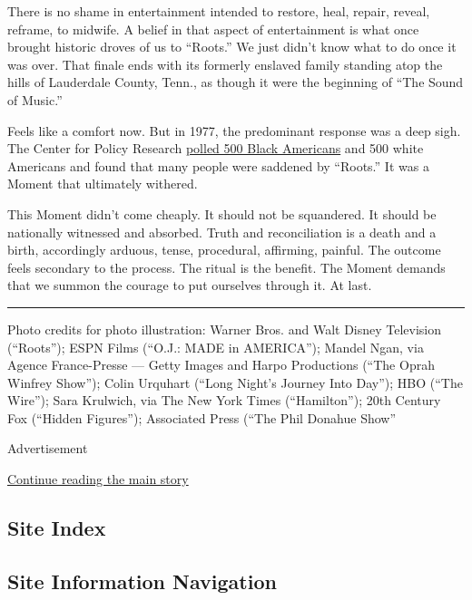 There is no shame in entertainment intended to restore, heal, repair,
reveal, reframe, to midwife. A belief in that aspect of entertainment is
what once brought historic droves of us to ``Roots.'' We just didn't
know what to do once it was over. That finale ends with its formerly
enslaved family standing atop the hills of Lauderdale County, Tenn., as
though it were the beginning of ``The Sound of Music.''

Feels like a comfort now. But in 1977, the predominant response was a
deep sigh. The Center for Policy Research
\href{https://www.nytimes.com/1977/06/07/archives/blacks-and-whites-found-to-have-misapprehensions-on-impact-of-roots.html?searchResultPosition=9}{polled
500 Black Americans} and 500 white Americans and found that many people
were saddened by ``Roots.'' It was a Moment that ultimately withered.

This Moment didn't come cheaply. It should not be squandered. It should
be nationally witnessed and absorbed. Truth and reconciliation is a
death and a birth, accordingly arduous, tense, procedural, affirming,
painful. The outcome feels secondary to the process. The ritual is the
benefit. The Moment demands that we summon the courage to put ourselves
through it. At last.

\begin{center}\rule{0.5\linewidth}{\linethickness}\end{center}

Photo credits for photo illustration: Warner Bros. and Walt Disney
Television (``Roots''); ESPN Films (``O.J.: MADE in AMERICA''); Mandel
Ngan, via Agence France-Presse --- Getty Images and Harpo Productions
(``The Oprah Winfrey Show''); Colin Urquhart (``Long Night's Journey
Into Day''); HBO (``The Wire''); Sara Krulwich, via The New York Times
(``Hamilton''); 20th Century Fox (``Hidden Figures''); Associated Press
(``The Phil Donahue Show''

Advertisement

\protect\hyperlink{after-bottom}{Continue reading the main story}

\hypertarget{site-index}{%
\subsection{Site Index}\label{site-index}}

\hypertarget{site-information-navigation}{%
\subsection{Site Information
Navigation}\label{site-information-navigation}}

